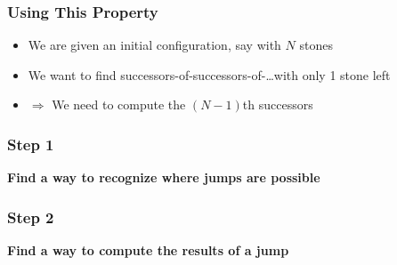 \documentclass{beamer}
\makeatletter
\newcommand{\configuration}[2]{
  \foreach[count=\i] \x in {#1} {
    \csname draw@\x\endcsname{($ #2 + (\i * 0.75,0)$)};
  }
}
\makeatother
\begin{document}
\begin{frame}
  \frametitle{Using This Property}
  \begin{itemize}
    \item We are given an initial configuration, say with $N$ stones
    \item We want to find successors-of-successors-of-\dots with only 1 stone left
    \item $\Rightarrow$ We need to compute the $(N-1)$th successors
  \end{itemize}
  \begin{center}
    \begin{minipage}{.9\linewidth}
      
    \end{minipage}
  \end{center}
\end{frame}

\begin{frame}
  \frametitle{Step 1}
  \begin{center}
    \bf Find a way to recognize where jumps are possible
  \end{center}
  \begin{center}
  \end{center}
\end{frame}

\begin{frame}
  \frametitle{Step 2}
  \begin{center}
    \bf Find a way to compute the results of a jump
  \end{center}
  \begin{center}
  \end{center}
\end{frame}
\end{document}
